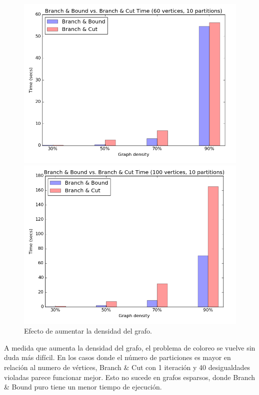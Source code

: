 \begin{figure}[h]
\begin{minipage}[b]{0.49\textwidth}
  \end{minipage}
  \begin{minipage}[b]{0.49\textwidth}
    \includegraphics[width=\textwidth]{img/1-bb_vs_bc_v60_p10_i1_co0_l40_t1_b0.png}
  \end{minipage}
  \hfill
  \begin{minipage}[b]{0.49\textwidth}
    \includegraphics[width=\textwidth]{img/1-bb_vs_bc_v100_p10_i1_co0_l40_t1_b0.png}
  \end{minipage}
	\caption{Efecto de aumentar la densidad del grafo.}
\end{figure}

A medida que aumenta la densidad del grafo, el problema de coloreo se vuelve sin duda más difícil. En los casos donde el número de particiones es mayor en relación al numero de vértices, Branch \& Cut con 1 iteración y 40 desigualdades violadas parece funcionar mejor. Esto no sucede en grafos esparsos, donde Branch \& Bound puro tiene un menor tiempo de ejecución.


